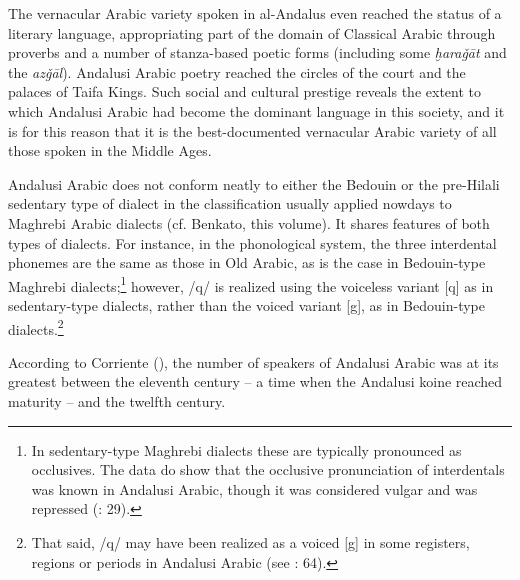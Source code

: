 \documentclass[output=paper,modfonts,nonflat]{langsci/langscibook}
\begin{document}
The vernacular Arabic variety spoken in al-Andalus even reached the status of a literary language, appropriating part of the domain of Classical Arabic through proverbs and a number of stanza-based poetic forms (including some \textit{ḫaraǧāt} and the \textit{azǧāl}). Andalusi Arabic poetry reached the circles of the court and the palaces of Taifa Kings. Such social and cultural prestige reveals the extent to which Andalusi Arabic had become the dominant language in this society, and it is for this reason that it is the best-documented vernacular Arabic variety of all those spoken in the Middle Ages. 

Andalusi Arabic does not conform neatly to either the Bedouin or the pre-Hilali sedentary type of dialect in the classification usually applied nowdays to Maghrebi Arabic dialects (cf. Benkato, this volume). It shares features of both types of dialects. For instance, in the phonological system, the three interdental phonemes are the same as those in Old Arabic, as is the case in Bedouin-type Maghrebi dialects;\footnote{In sedentary-type Maghrebi dialects these are typically pronounced as occlusives. The data do show that the occlusive pronunciation of interdentals was known in Andalusi Arabic, though it was considered vulgar and was repressed (\citealt{CorrientePereiraVicente2015}: 29).}  however, /q/ is realized using the voiceless variant [q] as in sedentary-type dialects, rather than the voiced variant [g], as in Bedouin-type dialects.\footnote{That said, /q/ may have been realized as a voiced [g] in some registers, regions or periods in Andalusi Arabic (see \citealt{CorrientePereiraVicente2015}: 64).}

According to Corriente (\citeyear[34]{Corriente1992book}), the number of speakers of Andalusi Arabic was at its greatest between the eleventh century – a time when the Andalusi koine reached maturity – and the twelfth century. 
\end{document}
